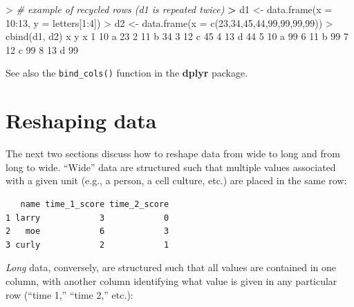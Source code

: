 \documentclass[
]{book}
\newenvironment{Shaded}{\begin{snugshade}}{\end{snugshade}}
\newcommand{\AttributeTok}[1]{\textcolor[rgb]{0.77,0.63,0.00}{#1}}
\newcommand{\CommentTok}[1]{\textcolor[rgb]{0.56,0.35,0.01}{\textit{#1}}}
\newcommand{\DecValTok}[1]{\textcolor[rgb]{0.00,0.00,0.81}{#1}}
\newcommand{\ErrorTok}[1]{\textcolor[rgb]{0.64,0.00,0.00}{\textbf{#1}}}
\newcommand{\FunctionTok}[1]{\textcolor[rgb]{0.00,0.00,0.00}{#1}}
\newcommand{\NormalTok}[1]{#1}
\newcommand{\OtherTok}[1]{\textcolor[rgb]{0.56,0.35,0.01}{#1}}
\newcommand{\SpecialCharTok}[1]{\textcolor[rgb]{0.00,0.00,0.00}{#1}}
\begin{document}
\begin{Shaded}
\begin{Highlighting}[]
\SpecialCharTok{\textgreater{}} \CommentTok{\# example of recycled rows (d1 is repeated twice)}
\ErrorTok{\textgreater{}}\NormalTok{ d1 }\OtherTok{\textless{}{-}} \FunctionTok{data.frame}\NormalTok{(}\AttributeTok{x =} \DecValTok{10}\SpecialCharTok{:}\DecValTok{13}\NormalTok{, }\AttributeTok{y =}\NormalTok{ letters[}\DecValTok{1}\SpecialCharTok{:}\DecValTok{4}\NormalTok{])}
\SpecialCharTok{\textgreater{}}\NormalTok{ d2 }\OtherTok{\textless{}{-}} \FunctionTok{data.frame}\NormalTok{(}\AttributeTok{x =} \FunctionTok{c}\NormalTok{(}\DecValTok{23}\NormalTok{,}\DecValTok{34}\NormalTok{,}\DecValTok{45}\NormalTok{,}\DecValTok{44}\NormalTok{,}\DecValTok{99}\NormalTok{,}\DecValTok{99}\NormalTok{,}\DecValTok{99}\NormalTok{,}\DecValTok{99}\NormalTok{))}
\SpecialCharTok{\textgreater{}} \FunctionTok{cbind}\NormalTok{(d1, d2)}
\NormalTok{   x y  x}
\DecValTok{1} \DecValTok{10}\NormalTok{ a }\DecValTok{23}
\DecValTok{2} \DecValTok{11}\NormalTok{ b }\DecValTok{34}
\DecValTok{3} \DecValTok{12}\NormalTok{ c }\DecValTok{45}
\DecValTok{4} \DecValTok{13}\NormalTok{ d }\DecValTok{44}
\DecValTok{5} \DecValTok{10}\NormalTok{ a }\DecValTok{99}
\DecValTok{6} \DecValTok{11}\NormalTok{ b }\DecValTok{99}
\DecValTok{7} \DecValTok{12}\NormalTok{ c }\DecValTok{99}
\DecValTok{8} \DecValTok{13}\NormalTok{ d }\DecValTok{99}
\end{Highlighting}
\end{Shaded}

See also the \texttt{bind\_cols()} function in the \textbf{dplyr} package.

\hypertarget{reshaping-data}{%
\section{Reshaping data}\label{reshaping-data}}

The next two sections discuss how to reshape data from wide to long and from long to wide. ``Wide'' data are structured such that multiple values associated with a given unit (e.g., a person, a cell culture, etc.) are placed in the same row:

\begin{verbatim}
   name time_1_score time_2_score
1 larry            3            0
2   moe            6            3
3 curly            2            1
\end{verbatim}

\emph{Long} data, conversely, are structured such that all values are contained in one column, with another column identifying what value is given in any particular row (``time 1,'' ``time 2,'' etc.):
\end{document}
